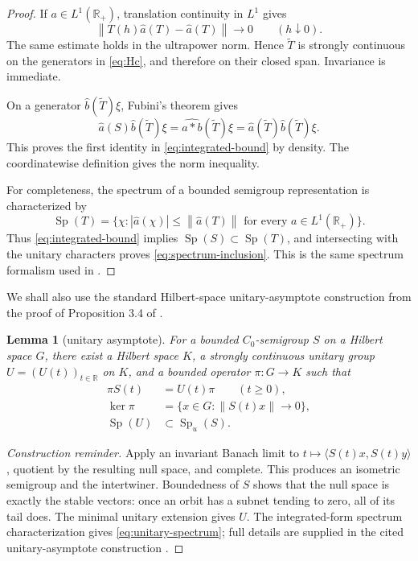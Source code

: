 \documentclass[11pt]{article}
\newtheorem{lemma}{Lemma}
\newcommand{\R}{\mathbb R}
\newcommand{\norm}[1]{\left\lVert#1\right\rVert}
\newcommand{\Sp}{\operatorname{Sp}}
\newcommand{\Spu}{\operatorname{Sp}_{u}}
\begin{document}
\begin{proof}
If \(a\in L^1(\R_+)\), translation continuity in \(L^1\) gives
\[
 \norm{T(h)\widehat a(T)-\widehat a(T)}\longrightarrow0
 \qquad(h\downarrow0).
\]
The same estimate holds in the ultrapower norm. Hence \(\widetilde T\) is
strongly continuous on the generators in \eqref{eq:Hc}, and therefore on
their closed span. Invariance is immediate.

On a generator \(\widehat b(\widetilde T)\xi\), Fubini's theorem gives
\[
 \widehat a(S)\widehat b(\widetilde T)\xi
 =\widehat{a*b}(\widetilde T)\xi
 =\widehat a(\widetilde T)\widehat b(\widetilde T)\xi.
\]
This proves the first identity in \eqref{eq:integrated-bound} by density.
The coordinatewise definition gives the norm inequality.

For completeness, the spectrum of a bounded semigroup representation is
characterized by
\[
 \Sp(T)=\{\chi:|\widehat a(\chi)|\le\norm{\widehat a(T)}
 \text{ for every }a\in L^1(\R_+)\}.
\]
Thus \eqref{eq:integrated-bound} implies \(\Sp(S)\subset\Sp(T)\), and
intersecting with the unitary characters proves
\eqref{eq:spectrum-inclusion}. This is the same spectrum formalism used in
\cite{SeifertHilbert}.
\end{proof}

We shall also use the standard Hilbert-space unitary-asymptote construction
from the proof of Proposition 3.4 of \cite{SeifertHilbert}.

\begin{lemma}[unitary asymptote]\label{lem:asymptote}
For a bounded \(C_0\)-semigroup \(S\) on a Hilbert space \(G\), there exist a
Hilbert space \(K\), a strongly continuous unitary group \(U=(U(t))_{t\in\R}\)
on \(K\), and a bounded operator \(\pi:G\to K\) such that
\begin{align}
 \pi S(t)&=U(t)\pi \qquad(t\ge0),\label{eq:intertwine}\\
 \ker\pi&=\{x\in G:\norm{S(t)x}\to0\},\label{eq:kernel}\\
 \Sp(U)&\subset\Spu(S).\label{eq:unitary-spectrum}
\end{align}
\end{lemma}

\begin{proof}[Construction reminder]
Apply an invariant Banach limit to
\(t\mapsto\langle S(t)x,S(t)y\rangle\), quotient by the resulting null
space, and complete. This produces an isometric semigroup and the
intertwiner. Boundedness of \(S\) shows that the null space is exactly the
stable vectors: once an orbit has a subnet tending to zero, all of its tail
does. The minimal unitary extension gives \(U\). The integrated-form
spectrum characterization gives \eqref{eq:unitary-spectrum}; full details
are supplied in the cited unitary-asymptote construction
\cite[proof of Proposition 3.4]{SeifertHilbert}.
\end{proof}
\end{document}
